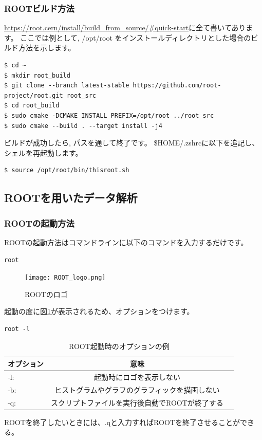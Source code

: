 \subsubsection{ROOTビルド方法}
\url{https://root.cern/install/build_from_source/#quick-start}に全て書いてあります。
ここでは例として, /opt/root をインストールディレクトリとした場合のビルド方法を示します。
\begin{lstlisting}
$ cd ~
$ mkdir root_build
$ git clone --branch latest-stable https://github.com/root-project/root.git root_src
$ cd root_build
$ sudo cmake -DCMAKE_INSTALL_PREFIX=/opt/root ../root_src
$ sudo cmake --build . --target install -j4
\end{lstlisting}

ビルドが成功したら, パスを通して終了です。
\$HOME/.zshrcに以下を追記し、シェルを再起動します。
\begin{lstlisting}
$ source /opt/root/bin/thisroot.sh
\end{lstlisting}

\subsection{ROOTを用いたデータ解析}

\subsubsection{ROOTの起動方法}
ROOTの起動方法はコマンドラインに以下のコマンドを入力するだけです。
\begin{lstlisting}
root
\end{lstlisting}
\begin{figure}[ht]
  \begin{center}
    \texttt{[image: ROOT\_logo.png]}
    \caption{ROOTのロゴ}
    \label{fig:ROOT_logo}
  \end{center}
\end{figure}
起動の度に図\ref{fig:ROOT_logo}が表示されるため、オプションをつけます。
\begin{lstlisting}
root -l
\end{lstlisting}
\begin{table}[ht]
  \caption{ROOT起動時のオプションの例}
  \centering
  \begin{tabular}{lcr}
    \hline
    オプション & 意味                                           \\
    \hline \hline
    -l:        & 起動時にロゴを表示しない                       \\
    -b:        & ヒストグラムやグラフのグラフィックを描画しない \\
    -q:        & スクリプトファイルを実行後自動でROOTが終了する \\
    \hline
  \end{tabular}
\end{table}
ROOTを終了したいときには、.qと入力すればROOTを終了させることができる。

